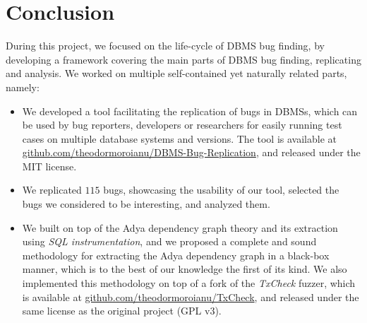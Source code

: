\chapter{Conclusion}

During this project, we focused on the life-cycle of DBMS bug finding, by developing a framework covering the main parts of DBMS bug finding, replicating and analysis. We worked on multiple self-contained yet naturally related parts, namely:

\begin{itemize}
    \item We developed a tool facilitating the replication of bugs in DBMSs, which can be used by bug reporters, developers or researchers for easily running test cases on multiple database systems and versions. The tool is available at \href{https://github.com/theodormoroianu/DBMS-Bug-Replication}{github.com/theodormoroianu/DBMS-Bug-Replication}, and released under the MIT license.
    \item We replicated $115$ bugs, showcasing the usability of our tool, selected the bugs we considered to be interesting, and analyzed them. 
    \item We built on top of the Adya dependency graph theory and its extraction using \textit{SQL instrumentation}, and we proposed a complete and sound methodology for extracting the Adya dependency graph in a black-box manner, which is to the best of our knowledge the first of its kind. We also implemented this methodology on top of a fork of the \textit{TxCheck} fuzzer, which is available at \href{https://github.com/theodormoroianu/TxCheck}{github.com/theodormoroianu/TxCheck}, and released under the same license as the original project (GPL v3). 
\end{itemize}


